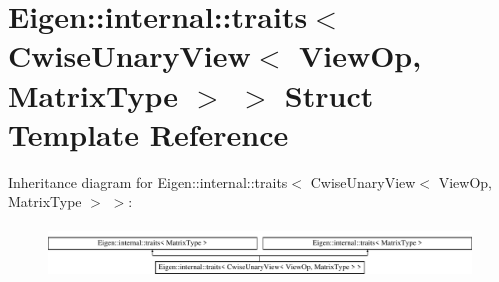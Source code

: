 \hypertarget{struct_eigen_1_1internal_1_1traits_3_01_cwise_unary_view_3_01_view_op_00_01_matrix_type_01_4_01_4}{}\section{Eigen\+:\+:internal\+:\+:traits$<$ Cwise\+Unary\+View$<$ View\+Op, Matrix\+Type $>$ $>$ Struct Template Reference}
\label{struct_eigen_1_1internal_1_1traits_3_01_cwise_unary_view_3_01_view_op_00_01_matrix_type_01_4_01_4}
Inheritance diagram for Eigen\+:\+:internal\+:\+:traits$<$ Cwise\+Unary\+View$<$ View\+Op, Matrix\+Type $>$ $>$\+:\begin{figure}[H]
\begin{center}
\leavevmode
\includegraphics[height=1.421320cm]{struct_eigen_1_1internal_1_1traits_3_01_cwise_unary_view_3_01_view_op_00_01_matrix_type_01_4_01_4}
\end{center}
\end{figure}
